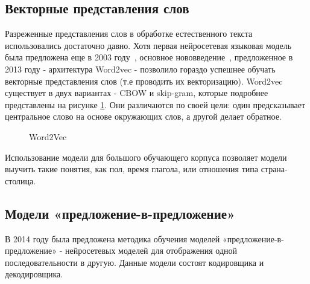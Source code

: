 \subsection{Векторные представления слов}
Разреженные представления слов в обработке естественного текста использовались достаточно давно. Хотя первая нейросетевая языковая модель была предложена еще в 2003 году~\cite{bengio_2003}, основное нововведение~\cite{mikolov_2013}, предложенное в 2013 году - архитектура Word2vec - позволило гораздо успешнее обучать векторные представления слов (т.е проводить их векторизацию). Word2vec существует в двух вариантах - CBOW и skip-gram, которые подробнее представлены на рисунке \ref{fig:Neuro2-Word2Vec}. Они различаются по своей цели: один предсказывает центральное слово на основе окружающих слов, а другой делает обратное.


\begin{figure}[ht]
 \caption{Word2Vec}\label{fig:Neuro2-Word2Vec}
\end{figure}

Использование модели для большого обучающего корпуса позволяет модели выучить такие понятия, как пол, время глагола, или отношения типа страна-столица. 

%
\subsection{Модели «предложение-в-предложение»}
В 2014 году была предложена методика обучения моделей «предложение-в-предложение» \cite{sutskever_2014} - нейросетевых моделей для отображения одной последовательности в другую. Данные модели состоят кодировщика и декодировщика. 

